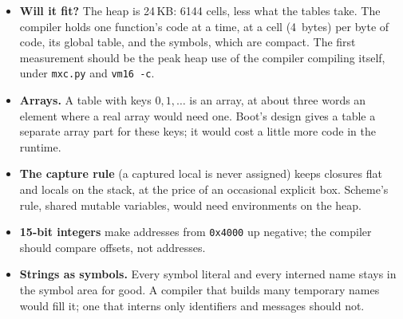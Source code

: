 \documentclass[11pt,a4paper]{article}
\newcommand{\hx}[1]{\texttt{0x#1}}
\begin{document}
\begin{itemize}[nosep]
\item \textbf{Will it fit?} The heap is 24\,KB: 6144 cells, less what the
  tables take. The compiler holds one function's code at a time, at a cell
  (4~bytes) per byte of code, its global table, and the symbols, which are
  compact. The first measurement should be the peak heap
  use of the compiler compiling itself, under \texttt{mxc.py} and
  \texttt{vm16 -c}.
\item \textbf{Arrays.} A table with keys $0, 1, \ldots$ is an array, at
  about three words an element where a real array would need one. Boot's
  design gives a table a separate array part for these keys; it would cost
  a little more code in the runtime.
\item \textbf{The capture rule} (a captured local is never assigned) keeps
  closures flat and locals on the stack, at the price of an occasional
  explicit box. Scheme's rule, shared mutable variables, would need
  environments on the heap.
\item \textbf{15-bit integers} make addresses from \hx{4000} up negative;
  the compiler should compare offsets, not addresses.
\item \textbf{Strings as symbols.} Every symbol literal and every interned
  name stays in the symbol area for good. A compiler that builds many
  temporary names would fill it; one that interns only identifiers and
  messages should not.
\end{itemize}
\end{document}
